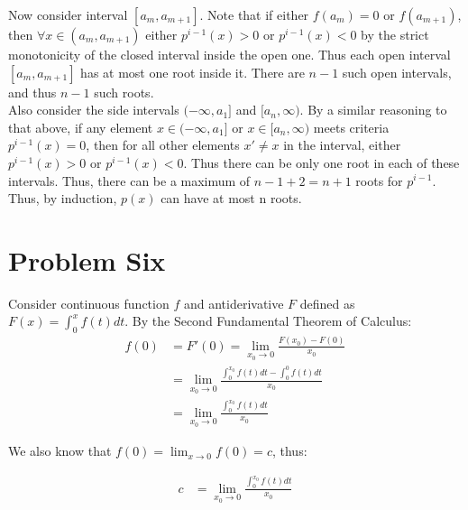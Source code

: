 \documentclass[10pt]{article} %
\begin{document}
Now consider interval $[a_m,a_{m+1}]$. Note that if either $f(a_m)=0$ or $f(a_{m+1})$, then $\forall x \in (a_m,a_{m+1})$ either $p^{i-1}(x)>0$ or $p^{i-1}(x)<0$ by the strict monotonicity of the closed interval inside the open one. Thus each open interval $[a_m,a_{m+1}]$ has at most one root inside it. There are $n-1$ such open intervals, and thus $n-1$ such roots.\\

Also consider the side intervals $(-\infty,a_1]$ and $[a_n,\infty)$. By a similar reasoning to that above, if any element $x \in (-\infty,a_1]$ or $x \in [a_n,\infty)$ meets criteria $p^{i-1}(x)=0$, then for all other elements $x'\neq x$ in the interval, either $p^{i-1}(x)>0$ or $p^{i-1}(x)<0$. Thus there can be only one root in each of these intervals. Thus, there can be a maximum of $n-1+2=n+1$ roots for $p^{i-1}$.\\

Thus, by induction, $p(x)$ can have at most n roots.\\

\section{Problem Six}
Consider continuous function $f$ and antiderivative $F$ defined as $F(x) = \int_0^{x}f(t)dt$. By the Second Fundamental Theorem of Calculus:\\

\begin{align*}
  f(0) &= F'(0) = \lim_{x_0\rightarrow0} \frac{F(x_0)-F(0)}{x_0}\\
  &= \lim_{x_0\rightarrow0} \frac{\int_0^{x_0}f(t)dt-\int_0^0f(t)dt}{x_0}\\
  &= \lim_{x_0\rightarrow0} \frac{\int_0^{x_0}f(t)dt}{x_0}
\end{align*}

We also know that $f(0) = \lim_{x\rightarrow0}f(0)=c$, thus:

\begin{align*}
  c &= \lim_{x_0\rightarrow0} \frac{\int_0^{x_0}f(t)dt}{x_0}
\end{align*}
\end{document}
